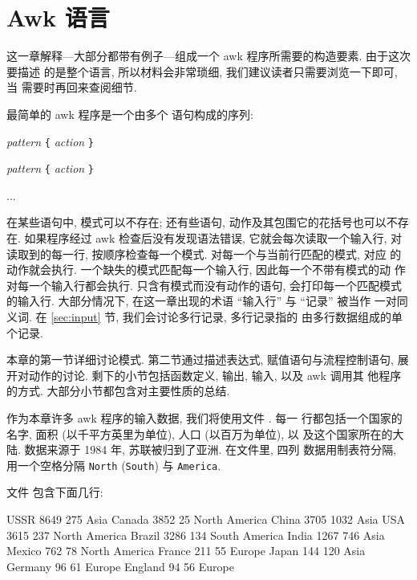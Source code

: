 
\chapter{Awk 语言}
\label{chap:the_awk_language}

这一章解释---大部分都带有例子---组成一个 awk 程序所需要的构造要素.
由于这次要描述
的是整个语言, 所以材料会非常琐细, 我们建议读者只需要浏览一下即可, 当
需要时再回来查阅细节.

最简单的 awk 程序是一个由多个 \patact 语句构成的序列:
\begin{pattern}
\textit{pattern} \texttt{\{} \textit{action} \texttt{\}} \par
\textit{pattern} \texttt{\{} \textit{action} \texttt{\}} \par
...
\end{pattern}
在某些语句中, 模式可以不存在; 还有些语句, 动作及其包围它的花括号也可以不存
在. 如果程序经过 awk 检查后没有发现语法错误, 它就会每次读取一个输入行,
对读取到的每一行, 按顺序检查每一个模式. 对每一个与当前行匹配的模式, 对应
的动作就会执行. 一个缺失的模式匹配每一个输入行, 因此每一个不带有模式的动
作对每一个输入行都会执行. 只含有模式而没有动作的语句, 会打印每一个匹配模式
的输入行. 大部分情况下, 在这一章出现的术语 ``输入行'' 与 ``记录'' 被当作
一对同义词. 在 \ref{sec:input} 节, 我们会讨论多行记录, 多行记录指的
由多行数据组成的单个记录.

本章的第一节详细讨论模式. 第二节通过描述表达式, 赋值语句与流程控制语句,
展开对动作的讨论. 剩下的小节包括函数定义, 输出, 输入, 以及 awk 调用其
他程序的方式. 大部分小节都包含对主要性质的总结.


作为本章许多 awk 程序的输入数据, 我们将使用文件 . 每一
行都包括一个国家的名字, 面积 (以千平方英里为单位), 人口 (以百万为单位), 以
及这个国家所在的大陆. 数据来源于 1984 年, 苏联被归到了亚洲. 在文件里, 四列
数据用制表符分隔, 用一个空格分隔 \texttt{North} (\texttt{South}) 与
\texttt{America}.

文件  包含下面几行:
\begin{awkcode}
    USSR        8649    275     Asia
    Canada      3852    25      North America
    China       3705    1032    Asia
    USA         3615    237     North America
    Brazil      3286    134     South America
    India       1267    746     Asia
    Mexico      762     78      North America
    France      211     55      Europe
    Japan       144     120     Asia
    Germany     96      61      Europe
    England     94      56      Europe
\end{awkcode}

